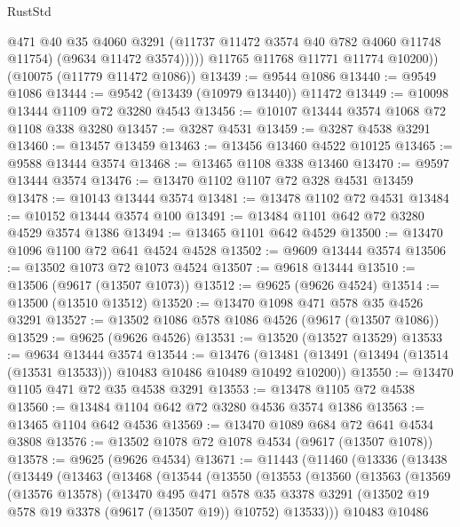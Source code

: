 \begin{lexlean}{RustStd}
\begin{coremodule}
                @471
                @40
                @35
                @4060
                @3291
                (@11737 @11472 @3574 @40 @782 @4060 @11748 @11754)
                (@9634 @11472 @3574)))))
        @11765
        @11768
        @11771
        @11774
        @10200))
    (@10075 (@11779 @11472 @1086))
@13439 := @9544 @1086
@13440 := @9549 @1086
@13444 := @9542 (@13439 (@10979 @13440)) @11472
@13449 := @10098 @13444 @1109 @72 @3280 @4543
@13456 := @10107 @13444 @3574 @1068 @72 @1108 @338 @3280
@13457 := @3287 @4531
@13459 := @3287 @4538 @3291
@13460 := @13457 @13459
@13463 := @13456 @13460 @4522 @10125
@13465 := @9588 @13444 @3574
@13468 := @13465 @1108 @338 @13460
@13470 := @9597 @13444 @3574
@13476 := @13470 @1102 @1107 @72 @328 @4531 @13459
@13478 := @10143 @13444 @3574
@13481 := @13478 @1102 @72 @4531
@13484 := @10152 @13444 @3574 @100
@13491 := @13484 @1101 @642 @72 @3280 @4529 @3574 @1386
@13494 := @13465 @1101 @642 @4529
@13500 := @13470 @1096 @1100 @72 @641 @4524 @4528
@13502 := @9609 @13444 @3574
@13506 := @13502 @1073 @72 @1073 @4524
@13507 := @9618 @13444
@13510 := @13506 (@9617 (@13507 @1073))
@13512 := @9625 (@9626 @4524)
@13514 := @13500 (@13510 @13512)
@13520 := @13470 @1098 @471 @578 @35 @4526 @3291
@13527 := @13502 @1086 @578 @1086 @4526 (@9617 (@13507 @1086))
@13529 := @9625 (@9626 @4526)
@13531 := @13520 (@13527 @13529)
@13533 := @9634 @13444 @3574
@13544 := @13476
    (@13481 (@13491 (@13494 (@13514 (@13531 @13533))) @10483 @10486 @10489 @10492 @10200))
@13550 := @13470 @1105 @471 @72 @35 @4538 @3291
@13553 := @13478 @1105 @72 @4538
@13560 := @13484 @1104 @642 @72 @3280 @4536 @3574 @1386
@13563 := @13465 @1104 @642 @4536
@13569 := @13470 @1089 @684 @72 @641 @4534 @3808
@13576 := @13502 @1078 @72 @1078 @4534 (@9617 (@13507 @1078))
@13578 := @9625 (@9626 @4534)
@13671 := @11443
    (@11460
      (@13336
        (@13438
          (@13449
            (@13463
              (@13468
                (@13544
                  (@13550
                    (@13553
                      (@13560
                        (@13563
                          (@13569
                            (@13576 @13578)
                            (@13470
                              @495
                              @471
                              @578
                              @35
                              @3378
                              @3291
                              (@13502 @19 @578 @19 @3378 (@9617 (@13507 @19)) @10752)
                              @13533)))
                        @10483
                        @10486

\end{coremodule}
\end{lexlean}
